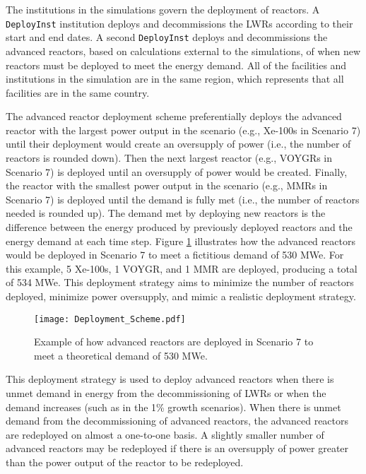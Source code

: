 The institutions in the simulations 
govern the deployment of reactors. A \Cycamore \texttt{DeployInst} 
institution \cite{huff_fundamental_2016} deploys and decommissions the 
\glspl{LWR} according to their start and end dates. A second \Cycamore 
\texttt{DeployInst} deploys and decommissions the advanced reactors, 
based on calculations external to the \Cyclus simulations, of when 
new reactors must be deployed to meet the energy 
demand. All of the facilities and institutions in the simulation are in 
the same region, which represents that all facilities are in the same 
country. 

The advanced reactor deployment scheme preferentially deploys the advanced 
reactor with the largest power output in the scenario (e.g., Xe-100s in 
Scenario 7) until their deployment would create an oversupply of power
(i.e., the number of reactors is rounded down). 
Then the next largest reactor (e.g., VOYGRs in Scenario 7) is deployed 
until an oversupply of power would be 
created. Finally, the reactor 
with the smallest power output in the scenario (e.g., \glspl{MMR} in 
Scenario 7) is deployed until the demand is fully met (i.e., the number of 
reactors needed is rounded up). The demand 
met by deploying new reactors is the difference between the energy 
produced by previously deployed reactors and the energy demand at each 
time step. 
Figure \ref{fig:AR_deployment} illustrates how the advanced reactors 
would be deployed in Scenario 7 to meet a fictitious demand of 530 MWe. For this 
example, 5 Xe-100s, 1 VOYGR, and 1 \gls{MMR} are deployed, producing a 
total of 534 MWe. This deployment 
strategy aims to minimize the number of reactors deployed,  
minimize power oversupply, and mimic a realistic deployment strategy.

\begin{figure}[ht]
    \centering
    \texttt{[image: Deployment\_Scheme.pdf]}
    \caption{Example of how advanced reactors are deployed in Scenario 7 
    to meet a theoretical demand of 530 MWe.}
    \label{fig:AR_deployment}
\end{figure}

This deployment strategy is used to deploy advanced reactors when there is
unmet demand in energy from the decommissioning of \glspl{LWR} or 
when the demand increases (such as in the 1\% growth scenarios). When 
there is unmet demand from the decommissioning of advanced reactors, the 
advanced reactors are redeployed on almost a one-to-one basis. A slightly
smaller number of advanced reactors may be redeployed if there is an 
oversupply of power greater than the power output of the reactor to be 
redeployed. 


